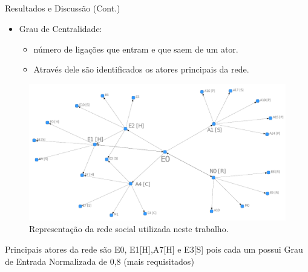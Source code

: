 \documentclass[10pt]{beamer}
\begin{document}
\subsection{}
\begin{frame}{Resultados e Discussão (Cont.)}{}
  \begin{itemize}
    \item Grau de Centralidade:
    \begin{itemize}
    	\item número de ligações que entram e que saem de um ator. 
	\item Através dele são identificados os atores principais da rede.
    \end{itemize}
  \end{itemize}
\begin{figure}[htbp]
\centering
 \includegraphics[width=.7\textwidth]{figuras/grafo.pdf}
 \caption{Representação da rede social utilizada neste trabalho.}
\label{fig:grafos}
\end{figure}
  Principais atores da rede são E0, E1[H],A7[H] e E3[S] pois cada um possui Grau de Entrada Normalizada de 0,8 (mais requisitados)
\end{frame}

\section{}
\end{document}
